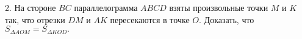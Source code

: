 2. На стороне $BC$ параллелограмма $ABCD$ взяты произвольные точки $M$ и $K$ так, что отрезки $DM$ и $AK$ пересекаются в точке $O.$ Доказать, что $S_{\Delta AOM}=S_{\Delta KOD}.$\\
